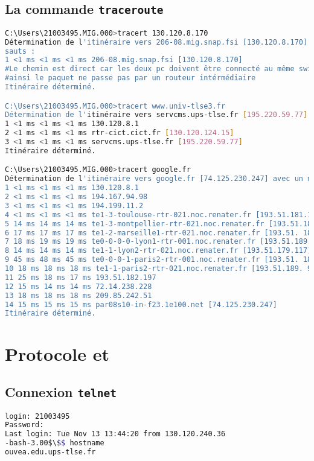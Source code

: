 \documentclass[a4paper, 11pt]{article}
\newcommand{\http}{\bsc{http}}
\newcommand{\ftp}{\bsc{ftp}}
\begin{document}
	\subsection{La commande \texttt{traceroute}}
\begin{lstlisting}[language=bash, basicstyle=\scriptsize\ttfamily]
C:\Users\21003495.MIG.000>tracert 130.120.8.170
Détermination de l'itinéraire vers 206-08.mig.snap.fsi [130.120.8.170] avec un maximum de 30
sauts :
1 <1 ms <1 ms <1 ms 206-08.mig.snap.fsi [130.120.8.170] 
#Le chemin est direct car les deux pc doivent être connecté au même switch, 
#ainsi le paquet ne passe pas par un routeur intérmédiaire
Itinéraire déterminé.

C:\Users\21003495.MIG.000>tracert www.univ-tlse3.fr
Détermination de l'itinéraire vers servcms.ups-tlse.fr [195.220.59.77] avec un maximum de 30 sauts :
1 <1 ms <1 ms <1 ms 130.120.8.1 
2 <1 ms <1 ms <1 ms rtr-cict.cict.fr [130.120.124.15]
3 <1 ms <1 ms <1 ms servcms.ups-tlse.fr [195.220.59.77]
Itinéraire déterminé.

C:\Users\21003495.MIG.000>tracert google.fr
Détermination de l'itinéraire vers google.fr [74.125.230.247] avec un maximum de 30 sauts :
1 <1 ms <1 ms <1 ms 130.120.8.1
2 <1 ms <1 ms <1 ms 194.167.94.98
3 <1 ms <1 ms <1 ms 194.199.11.2
4 <1 ms <1 ms <1 ms te1-3-toulouse-rtr-021.noc.renater.fr [193.51.181.178]
5 14 ms 14 ms 14 ms te1-3-montpellier-rtr-021.noc.renater.fr [193.51.189.33]
6 17 ms 17 ms 17 ms te1-2-marseille1-rtr-021.noc.renater.fr [193.51. 189.21]
7 18 ms 19 ms 19 ms te0-0-0-0-lyon1-rtr-001.noc.renater.fr [193.51.189.17]
8 14 ms 14 ms 14 ms te1-1-lyon2-rtr-021.noc.renater.fr [193.51.179.117]
9 45 ms 48 ms 45 ms te0-0-0-1-paris2-rtr-001.noc.renater.fr [193.51. 189.2]
10 18 ms 18 ms 18 ms te1-1-paris2-rtr-021.noc.renater.fr [193.51.189. 9]
11 25 ms 18 ms 17 ms 193.51.182.197
12 15 ms 14 ms 14 ms 72.14.238.228
13 18 ms 18 ms 18 ms 209.85.242.51
14 15 ms 15 ms 15 ms par08s10-in-f23.1e100.net [74.125.230.247]
Itinéraire déterminé.

\end{lstlisting}
	\section{Protocole \ftp{} et \http{}}
	\subsection{Connexion \texttt{telnet}}
\begin{lstlisting}[language=bash, basicstyle=\scriptsize\ttfamily]
login: 21003495
Password:
Last login: Tue Nov 13 13:44:20 from 130.120.240.36
-bash-3.00$\$$ hostname
ouvea.edu.ups-tlse.fr
\end{lstlisting}
\end{document}
